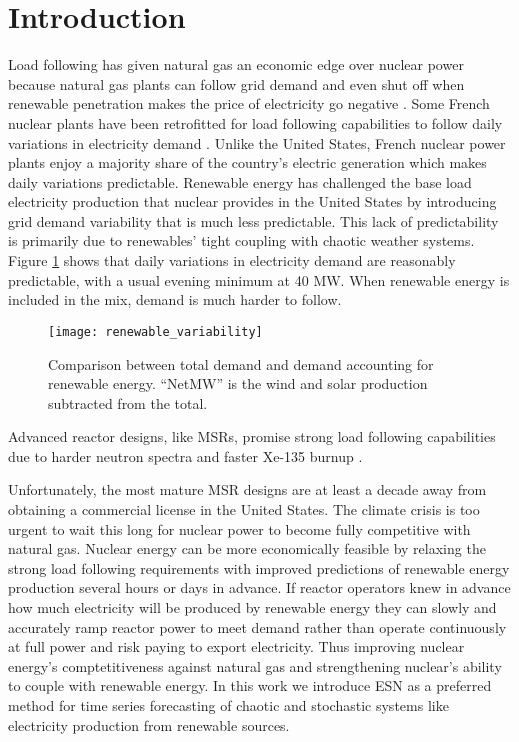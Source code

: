 \section{Introduction}

Load following has given natural gas an economic edge over nuclear power
because natural gas plants can follow grid demand and even shut off when
renewable penetration makes the
price of electricity go negative \cite{keppler_carbon_2011}. Some French nuclear
plants have been retrofitted for load following capabilities to follow daily
variations in electricity demand \cite{lokhov_technical_2011}. Unlike the United
States, French nuclear power plants enjoy a majority share of the country's
electric generation which makes daily variations predictable. Renewable energy
has challenged the base load electricity production that
nuclear provides in the United States by introducing grid demand variability
that is much less predictable. This lack of predictability is primarily due to
renewables' tight coupling with chaotic weather systems. Figure \ref{fig:vre}
shows
that daily variations in electricity demand are reasonably predictable, with a
usual evening minimum at 40 MW. When renewable energy is included in the mix,
demand is much harder to follow.

\begin{figure}[h]
  \centering
  \texttt{[image: renewable\_variability]}
  \caption{Comparison between total demand and demand accounting for renewable
   energy. ``NetMW'' is the wind and solar production subtracted from the
   total.}
  \label{fig:vre}
\end{figure}

Advanced reactor designs, like \glspl{MSR}, promise strong load following
capabilities due to harder
neutron spectra and faster Xe-135 burnup \cite{rykhlevskii_impact_2019}.

Unfortunately, the most mature MSR
designs are at least a decade away from obtaining a commercial license in the
United States. The climate crisis is too urgent to wait this long for nuclear
power to become fully competitive with natural gas.
Nuclear energy can be more economically feasible by relaxing the strong load
following requirements
with improved predictions of renewable energy production several hours or days
in advance. If reactor operators knew in advance how much electricity will be
produced by renewable energy they
can slowly and accurately ramp reactor power to meet demand rather than operate
continuously at full power and risk paying to export electricity. Thus
improving nuclear energy's comptetitiveness against natural gas and
strengthening nuclear's ability to couple with renewable energy.
In this work we introduce \acrfull{ESN} as a preferred method for time
series forecasting of chaotic and stochastic systems like electricity
production from renewable sources.
